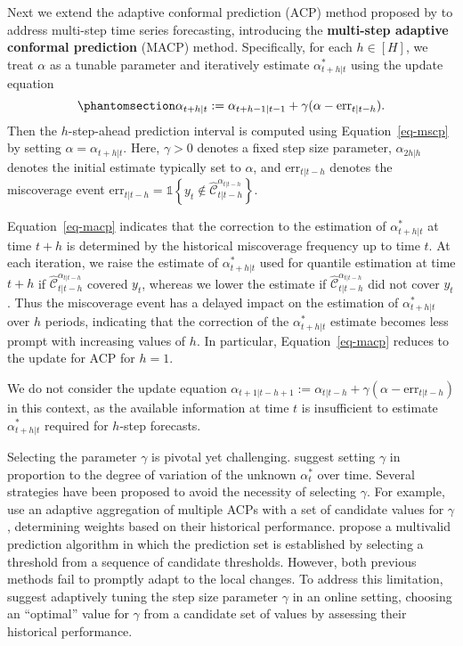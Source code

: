 \documentclass[
  11pt,
  a4paper,
]{article}
\theoremstyle{plain}
\theoremstyle{remark}
\begin{document}
Next we extend the adaptive conformal prediction (ACP) method proposed
by \textcite{gibbs2021} to address multi-step time series forecasting,
introducing the \textbf{multi-step adaptive conformal prediction} (MACP)
method. Specifically, for each \(h \in [H]\), we treat \(\alpha\) as a
tunable parameter and iteratively estimate \(\alpha_{t+h|t}^{*}\) using
the update
equation
\begin{equation}\phantomsection\label{eq-macp}{
\alpha_{t+h|t} := \alpha_{t+h-1|t-1} + \gamma(\alpha - \mathrm{err}_{t|t-h}).
}\end{equation} Then the \(h\)-step-ahead prediction interval is
computed using Equation~\ref{eq-mscp} by setting
\(\alpha = \alpha_{t+h|t}\). Here, \(\gamma > 0\) denotes a fixed step
size parameter, \(\alpha_{2h|h}\) denotes the initial estimate typically
set to \(\alpha\), and \(\mathrm{err}_{t|t-h}\) denotes the miscoverage
event
\(\mathrm{err}_{t|t-h} = \mathbb{1}\left\{y_t \notin \hat{\mathcal{C}}_{t|t-h}^{\alpha_{t|t-h}}\right\}\).

Equation~\ref{eq-macp} indicates that the correction to the estimation
of \(\alpha_{t+h|t}^{*}\) at time \(t+h\) is determined by the
historical miscoverage frequency up to time \(t\). At each iteration, we
raise the estimate of \(\alpha_{t+h|t}^{*}\) used for quantile
estimation at time \(t+h\) if
\(\hat{\mathcal{C}}_{t|t-h}^{\alpha_{t|t-h}}\) covered \(y_t\), whereas
we lower the estimate if \(\hat{\mathcal{C}}_{t|t-h}^{\alpha_{t|t-h}}\)
did not cover \(y_t\). Thus the miscoverage event has a delayed impact
on the estimation of \(\alpha_{t+h|t}^{*}\) over \(h\) periods,
indicating that the correction of the \(\alpha_{t+h|t}^{*}\) estimate
becomes less prompt with increasing values of \(h\). In particular,
Equation~\ref{eq-macp} reduces to the update for ACP for \(h=1\).

We do not consider the update equation
\(\alpha_{t+1|t-h+1} := \alpha_{t|t-h} + \gamma(\alpha - \mathrm{err}_{t|t-h})\)
in this context, as the available information at time \(t\) is
insufficient to estimate \(\alpha_{t+h|t}^{*}\) required for \(h\)-step
forecasts.

Selecting the parameter \(\gamma\) is pivotal yet challenging.
\textcite{gibbs2021} suggest setting \(\gamma\) in proportion to the
degree of variation of the unknown \(\alpha_{t}^{*}\) over time. Several
strategies have been proposed to avoid the necessity of selecting
\(\gamma\). For example, \textcite{zaffran2022} use an adaptive
aggregation of multiple ACPs with a set of candidate values for
\(\gamma\) , determining weights based on their historical performance.
\textcite{bastani2022} propose a multivalid prediction algorithm in
which the prediction set is established by selecting a threshold from a
sequence of candidate thresholds. However, both previous methods fail to
promptly adapt to the local changes. To address this limitation,
\textcite{gibbs2024} suggest adaptively tuning the step size parameter
\(\gamma\) in an online setting, choosing an ``optimal'' value for
\(\gamma\) from a candidate set of values by assessing their historical
performance.
\end{document}
